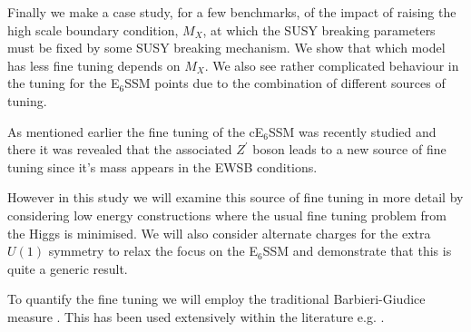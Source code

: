 \documentclass[preprint,amsmath,amssymb,aps,superscriptaddress,prd,showpacs,floatfix,nofootinbib]{revtex4-1}
\begin{document}
Finally we make a case study, for a few benchmarks, of the impact of
raising the high scale boundary condition, $M_X$, at which the SUSY
breaking parameters must be fixed by some SUSY breaking mechanism. We
show that which model has less fine tuning depends on $M_X$.  We also
see rather complicated behaviour in the tuning for the E$_6$SSM points
due to the combination of different sources of tuning.



As mentioned earlier the fine tuning of the cE$_6$SSM was recently studied
\cite{Athron:2013ipa} and there it was revealed that the associated
$Z^\prime$ boson leads to a new source of fine tuning since it's mass
appears in the EWSB conditions.  

However in this study we will examine this source of fine tuning in more
detail by considering low energy constructions where the usual fine
tuning problem from the Higgs is minimised.  We will also consider
alternate charges for the extra $U(1)$ symmetry to relax the focus on
the E$_6$SSM and demonstrate that this is quite a generic result.

To quantify the fine tuning we will employ the traditional
Barbieri-Giudice measure \cite{Ellis:1986yg,Barbieri:1987fn}.  This
has been used extensively within the literature
e.g. \cite{deCarlos:1993yy, deCarlos:1993ca, Chankowski:1997zh,
  Agashe:1997kn, Wright:1998mk, Kane:1998im, BasteroGil:1999gu,
  Feng:1999zg, Allanach:2000ii, Dermisek:2005ar, Barbieri:2005kf,
  Allanach:2006jc, Gripaios:2006nn, Dermisek:2006py, Barbieri:2006dq,
  Kobayashi:2006fh, Perelstein:2012qg, Antusch:2012gv,Cheng:2012pe,
  CahillRowley:2012rv, Ross:2012nr, Basak:2012bd, Kang:2012sy,
  Athron:2013ipa,Miller:2013jra, Binjonaid:2014oga, Miller:2014jza}.
\end{document}
